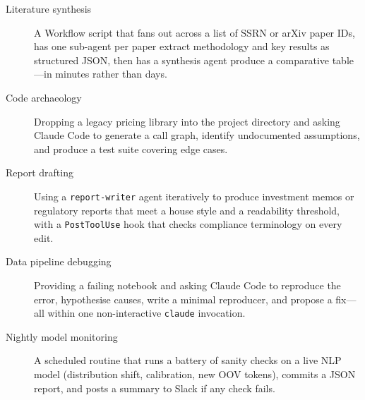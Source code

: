 \begin{description}
  \item[Literature synthesis] A Workflow script that fans out across a list of
        SSRN or arXiv paper IDs, has one sub-agent per paper extract
        methodology and key results as structured JSON, then has a synthesis
        agent produce a comparative table---in minutes rather than days.

  \item[Code archaeology] Dropping a legacy pricing library into the project
        directory and asking Claude Code to generate a call graph, identify
        undocumented assumptions, and produce a test suite covering edge cases.

  \item[Report drafting] Using a \texttt{report-writer} agent iteratively to
        produce investment memos or regulatory reports that meet a house style
        and a readability threshold, with a \texttt{PostToolUse} hook that
        checks compliance terminology on every edit.

  \item[Data pipeline debugging] Providing a failing notebook and asking Claude
        Code to reproduce the error, hypothesise causes, write a minimal
        reproducer, and propose a fix---all within one non-interactive
        \texttt{claude} invocation.

  \item[Nightly model monitoring] A scheduled routine that runs a battery of
        sanity checks on a live NLP model (distribution shift, calibration, new
        OOV tokens), commits a JSON report, and posts a summary to Slack if any
        check fails.
\end{description}

